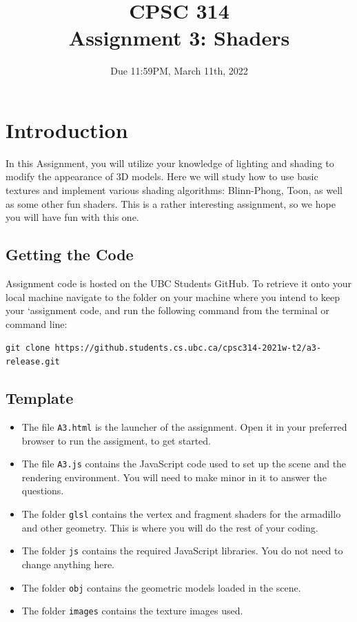 \documentclass[12pt]{exam}
\begin{document}
\title{CPSC 314\\
  Assignment 3: Shaders}
\date{Due 11:59PM, March 11th, 2022}

\maketitle 

\section{Introduction}

In this Assignment, you will utilize your knowledge of lighting and shading to modify the appearance of 3D models.
Here we will study how to use basic textures and implement various shading algorithms: Blinn-Phong, Toon, as well as some other fun shaders. This is a rather interesting assignment, so we hope you will have fun with this one.

\subsection{Getting the Code}
Assignment code is hosted on the UBC Students GitHub. To retrieve it
onto your local machine navigate to the folder on your machine where you intend to keep your
`assignment code, and run the following command from the terminal or command line:

\medskip
{\tt git clone https://github.students.cs.ubc.ca/cpsc314-2021w-t2/a3-release.git}



\subsection{Template}
\begin{itemize}
\item The file {\tt A3.html} is the launcher of the assignment. Open
  it in your preferred browser to run the assigment, to get started.
\item The file {\tt A3.js} contains the JavaScript code used to set up the scene and the rendering environment. You will need to make minor in it to answer the questions.
\item The folder {\tt glsl} contains the vertex and fragment shaders for the armadillo and other geometry. This is where you will do the rest of your coding.
\item The folder {\tt js} contains the required JavaScript libraries. You do not need to change anything here.
\item The folder {\tt obj} contains the geometric models loaded in the scene.
\item The folder {\tt images} contains the texture images used.
\end{itemize}
\end{document}
